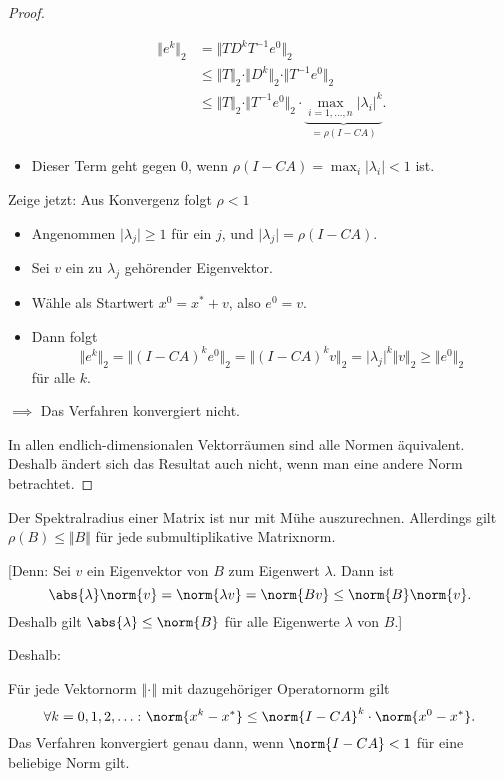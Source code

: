 \begin{proof}
\begin{itemize}
 \begin{align*}
  \Vert e^k \Vert_2 & =\Vert TD^kT^{-1}e^0 \Vert_2 \\
	& \leq \Vert T \Vert_2 \cdot \Vert D^k \Vert_2 \cdot \Vert T^{-1}e^0 \Vert_2 \\
	& \leq \Vert T \Vert_2 \cdot \Vert T^{-1}e^0 \Vert_2 \cdot \underbrace{\max_{i=1,\ldots,n} \left\vert \lambda_i \right\vert^k}_{=\rho (I-CA)}.
 \end{align*}
 \item Dieser Term geht gegen $0$, wenn $\rho(I-CA) = \max_i \vert \lambda_i \vert<1$ ist.
\end{itemize}
Zeige jetzt: Aus Konvergenz folgt $\rho <1$ \begin{itemize}
	\item Angenommen $\vert \lambda_j \vert \geq 1 $ für ein $j$, und $\vert \lambda_j \vert =\rho (I-CA)$.
	\item Sei $v$ ein zu $\lambda_j$ gehörender Eigenvektor.
	\item Wähle als Startwert $x^0=x^* +v$, also $e^0=v$.
	\item Dann folgt
 \begin{equation*}
  \Vert e^k \Vert_2 = \Vert (I-CA)^k e^0 \Vert_2 = \Vert (I-CA)^k v \Vert_2
  =
  \vert \lambda_j \vert^k \Vert v \Vert_2
  \geq
  \Vert e^0 \Vert_2
 \end{equation*}
		für alle $k$.
\end{itemize}
$\implies$ Das Verfahren konvergiert nicht.

\medskip

In allen endlich-dimensionalen Vektorräumen sind alle Normen äquivalent.
Deshalb ändert sich das Resultat auch nicht, wenn man eine andere Norm betrachtet.
\end{proof}

Der Spektralradius einer Matrix ist nur mit Mühe auszurechnen. Allerdings gilt $\rho (B) \leq \Vert B \Vert$
für jede submultiplikative Matrixnorm.

[Denn: Sei $v$ ein Eigenvektor von $B$ zum Eigenwert $\lambda$.  Dann ist
\begin{equation*}
 \abs{\lambda}\norm{v}
 =
 \norm{\lambda v}
 =
 \norm{B v}
 \le
 \norm{B}\norm{v}.
\end{equation*}
Deshalb gilt $\abs{\lambda} \le \norm{B}$ für alle Eigenwerte $\lambda$ von $B$.]


Deshalb:
\begin{kor}
Für jede Vektornorm $\left\Vert \cdot \right\Vert$ mit dazugehöriger Operatornorm gilt
\begin{equation*}
 \forall k=0,1,2,\ldots \colon \norm{x^k-x^*} \leq \norm{I-CA}^k \cdot \norm{x^0-x^*}.
\end{equation*}
Das Verfahren konvergiert genau dann, wenn $\norm{I-CA} <1$ für eine beliebige Norm gilt.
\end{kor}

